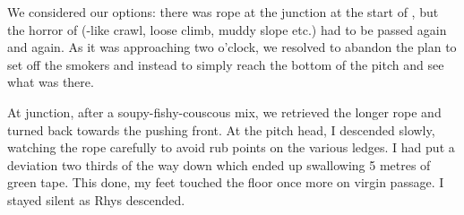 We considered our options: there was rope at the junction at the start of , but the horror of  (-like crawl, loose climb, muddy slope etc.) had to be passed again and again. As it was approaching two o'clock, we resolved to abandon the plan to set off the smokers and instead to simply reach the bottom of the pitch and see what was there.

At  junction, after a soupy-fishy-couscous mix, we retrieved the longer rope and turned back towards the pushing front. At the pitch head, I descended slowly, watching the rope carefully to avoid rub points on the various ledges. I had put a deviation two thirds of the way down which ended up swallowing 5 metres of green tape. This done, my feet touched the floor once more on virgin passage. I stayed silent as Rhys descended.

